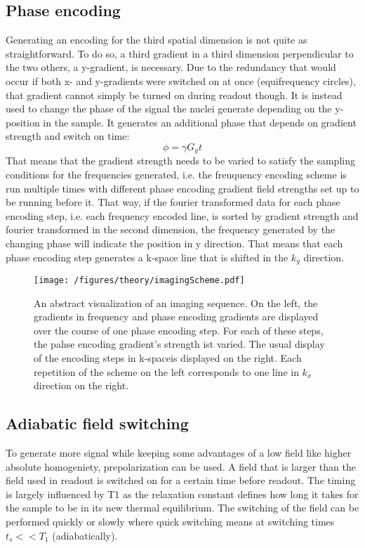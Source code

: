         \subsection{Phase encoding}
            Generating an encoding for the third spatial dimension is not quite as straightforward.  To do so, a third gradient in a third dimension perpendicular to the two others, a y-gradient, is necessary.  Due to the redundancy that would occur if both x- and y-gradients were switched on at once (equifrequency circles), that gradient cannot simply be turned on during readout though.  It is instead used to change the phase of the signal the nuclei generate depending on the y-position in the sample. It generates an additional phase that depends on gradient strength and switch on time:
            \begin{equation}
                \phi = \gamma G_y t
            \end{equation}
            That means that the gradient strength needs to be varied to satisfy the sampling conditions for the frequencies generated, i.e. the freuquency encoding scheme is run multiple times with different phase encoding gradient field strengths set up to be running before it. That way, if the fourier transformed data for each phase encoding step, i.e. each frequency encoded line, is sorted by gradient strength and fourier transformed in the second dimension, the frequency generated by the changing phase will indicate the position in y direction. That means that each phase encoding step generates a k-space line that is shifted in the $k_y$ direction.
            \begin{figure}
                \texttt{[image: /figures/theory/imagingScheme.pdf]}
                \centering
                \caption[k-space Graph]{An abstract visualization of an imaging sequence. On the left, the gradients in frequency and phase encoding gradients are displayed over the course of one phase encoding step. For each of these steps, the pahse encoding gradient's strength ist varied. The usual display of the encoding steps in k-spaceis displayed on the right. Each repetition of the scheme on the left corresponds to one line in $k_x$ direction on the right.}
            \end{figure}
        \subsection{Adiabatic field switching}
        To generate more signal while keeping some advantages of a low field like higher absolute homogeniety, prepolarization can be used. A field that is larger than the field used in readout is switched on for a certain time before readout. The timing is largely influenced by T1 as the relaxation constant defines how long it takes for the sample to be in its new thermal equilibrium. The switching of the field can be performed quickly or slowly where quick switching means at switching times $t_s << T_1$ (adiabatically). 
